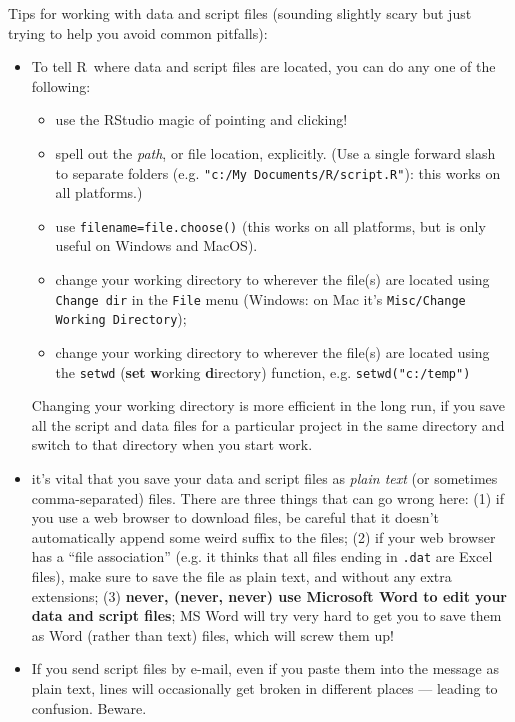 \documentclass[11pt]{article}\usepackage[]{graphicx}\usepackage[]{color}
\newcommand{\code}[1]{{\tt #1}}
\newcommand\R{{\sf R}}
\numberwithin{exercise}{section}
\begin{document}
Tips for working with data and script files
(sounding slightly scary but just trying to help you avoid common
pitfalls):
\begin{itemize}
\item{To tell \R\ where data and script files are located, you 
    can do any one of the following:
    \begin{itemize}
    \item{use the RStudio magic of pointing and clicking!}
    \item{spell out the {\em path}, or file location, explicitly. (Use
        a single forward slash to separate folders
        (e.g. \verb+"c:/My Documents/R/script.R"+):
        this works on all platforms.)}
    \item{use \code{filename=file.choose()} (this works on all
        platforms, but is only useful on Windows and MacOS).}
    \item{change your working directory to wherever the file(s) are located
        using \code{Change dir} in the \code{File} menu (Windows:
        on Mac it's \code{Misc/Change Working Directory});}
    \item{change your working directory to wherever the file(s) are located
        using the \code{setwd} (\textbf{set} \textbf{w}orking \textbf{d}irectory)
        function, e.g. \verb+setwd("c:/temp")+}
    \end{itemize}
    Changing your working directory is more efficient in the long run, if
    you save all the script and data files for a particular project in the
    same directory and switch to that directory when you start work.  }
\item{it's vital that you save your data and script files as
    \emph{plain text} (or sometimes comma-separated) files.  There are
    three things that can go wrong here: (1) if you use a web browser
    to download files, be careful that it doesn't automatically append
    some weird suffix to the files; (2) if your web browser has a
    ``file association'' (e.g. it thinks that all files ending in
    \code{.dat} are Excel files), make sure to save the file as plain
    text, and without any extra extensions; (3) \textbf{never, (never,
      never) use Microsoft Word to edit your data and script files};
    MS Word will try very hard to get you to save them as Word (rather
    than text) files, which will screw them up!}
\item{If you send script files by e-mail, even if you paste them into
    the message as plain text, lines will occasionally get broken in
    different places --- leading to confusion.  Beware.}
\end{itemize}
\end{document}
